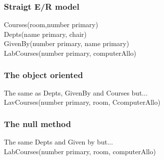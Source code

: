 \documentclass[12pt, a4paper]{article}
\begin{document}
		 		\subsubsection{Straigt E/R model}
					Courses(room,number primary)\\
					Depts(name primary, chair)\\
					GivenBy(number primary, name primary)\\
					LabCourses(number primary, computerAllo)
				\subsubsection{The object oriented}
					The same as Depts, GivenBy and Courses but...\\
					LavCourses(number primary, room, CcomputerAllo)
				\subsubsection{The null method}
					The same Depts and Given by but...\\
					LabCourses(number primary, room, computerAllo)

				
\end{document}
